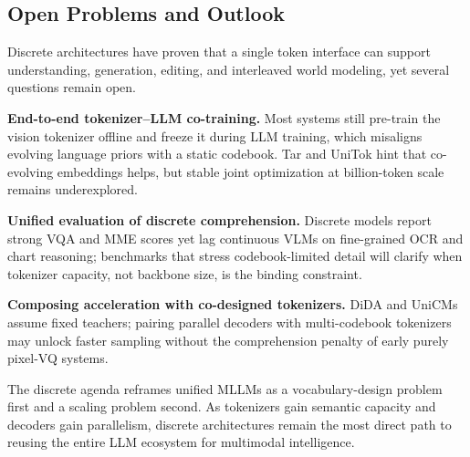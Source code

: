 \subsection{Open Problems and Outlook}
\label{subsec:discrete-outlook}

Discrete architectures have proven that a single token interface can support understanding, generation, editing, and interleaved world modeling, yet several questions remain open.

\textbf{End-to-end tokenizer--LLM co-training.} Most systems still pre-train the vision tokenizer offline and freeze it during LLM training, which misaligns evolving language priors with a static codebook. Tar and UniTok hint that co-evolving embeddings helps, but stable joint optimization at billion-token scale remains underexplored.

\textbf{Unified evaluation of discrete comprehension.} Discrete models report strong VQA and MME scores yet lag continuous VLMs on fine-grained OCR and chart reasoning; benchmarks that stress codebook-limited detail will clarify when tokenizer capacity, not backbone size, is the binding constraint.

\textbf{Composing acceleration with co-designed tokenizers.} DiDA and UniCMs assume fixed teachers; pairing parallel decoders with multi-codebook tokenizers may unlock faster sampling without the comprehension penalty of early purely pixel-VQ systems.

The discrete agenda reframes unified MLLMs as a vocabulary-design problem first and a scaling problem second. As tokenizers gain semantic capacity and decoders gain parallelism, discrete architectures remain the most direct path to reusing the entire LLM ecosystem for multimodal intelligence.

